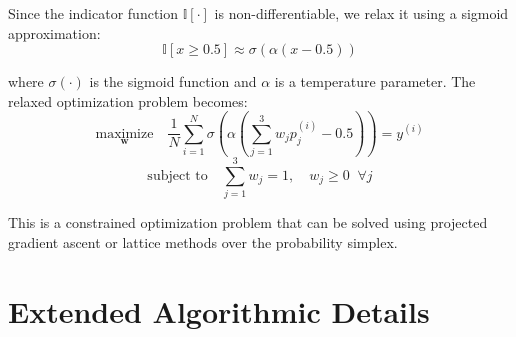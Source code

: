\documentclass[journal,12pt]{IEEEtran}
\begin{document}
Since the indicator function $\mathbb{I}[\cdot]$ is non-differentiable,
we relax it using a sigmoid approximation:
\begin{equation}
    \mathbb{I}[x \geq 0.5] \approx \sigma(\alpha(x - 0.5))
\end{equation}

where $\sigma(\cdot)$ is the sigmoid function and $\alpha$ is a
temperature parameter. The relaxed optimization problem becomes:
\begin{equation}
    \underset{\mathbf{w}}{\text{maximize}} \quad \frac{1}{N}\sum_{i=1}^{N}
    \sigma\!\left(\alpha\!\left(\sum_{j=1}^{3} w_j p_j^{(i)} - 0.5\right)\right) = y^{(i)}
\end{equation}
\begin{equation}
    \text{subject to} \quad \sum_{j=1}^{3} w_j = 1, \quad w_j \geq 0 \;\; \forall j
\end{equation}

This is a constrained optimization problem that can be solved using
projected gradient ascent or lattice methods over the probability simplex.

\section{Extended Algorithmic Details}
\label{sec:extended_algorithms}
\end{document}
